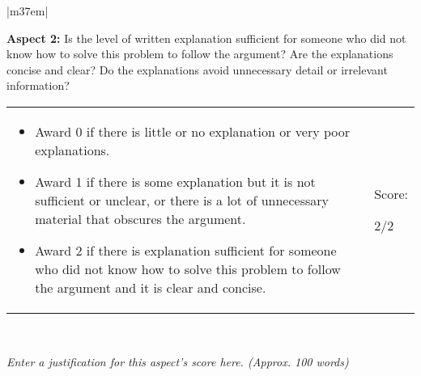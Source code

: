 \documentclass[article,11pt]{book}
\begin{document}
\begin{tabular}{|m{37em}|}
    \hline
    
    \textbf{Aspect 2:} Is the level of written explanation sufficient for someone who did not know how to solve this problem to follow the argument? Are the explanations concise and clear? Do the explanations avoid unnecessary detail or irrelevant information?  
    \\ \hline
    
    \begin{tabular}{m{32em}|m{5em}}
      \begin{itemize}
          \item Award 0 if there is little or no explanation or very poor explanations.
          \item Award 1 if there is some explanation but it is not sufficient or unclear, or there is a lot of unnecessary material that obscures the argument.
          \item Award 2 if there is explanation sufficient for someone who did not know how to solve this problem to follow the argument and it is clear and concise.
      \end{itemize}  
      &  
      Score: 
      
      \medskip
      {\huge 2/2}
    \end{tabular} 
    \\ \hline
    
    \textit{Enter a justification for this aspect’s score here. (Approx. 100 words)}
    \\ \hline
\end{tabular}

\bigskip

\end{document}

